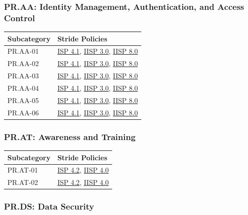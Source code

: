 \documentclass[11pt,landscape]{article}
\begin{document}
\subsubsection{PR.AA: Identity Management, Authentication, and Access Control}

\begin{tabularx}{\textwidth}{|p{3.5cm}|X|}
\hline
\rowcolor{headgray} \textbf{Subcategory} & \textbf{Stride Policies} \\
\hline
PR.AA-01 & \hyperref[pol:ISP41]{ISP 4.1}, \hyperref[pol:IISP30]{IISP 3.0}, \hyperref[pol:IISP80]{IISP 8.0} \\
\hline
PR.AA-02 & \hyperref[pol:ISP41]{ISP 4.1}, \hyperref[pol:IISP30]{IISP 3.0}, \hyperref[pol:IISP80]{IISP 8.0} \\
\hline
PR.AA-03 & \hyperref[pol:ISP41]{ISP 4.1}, \hyperref[pol:IISP30]{IISP 3.0}, \hyperref[pol:IISP80]{IISP 8.0} \\
\hline
PR.AA-04 & \hyperref[pol:ISP41]{ISP 4.1}, \hyperref[pol:IISP30]{IISP 3.0}, \hyperref[pol:IISP80]{IISP 8.0} \\
\hline
PR.AA-05 & \hyperref[pol:ISP41]{ISP 4.1}, \hyperref[pol:IISP30]{IISP 3.0}, \hyperref[pol:IISP80]{IISP 8.0} \\
\hline
PR.AA-06 & \hyperref[pol:ISP41]{ISP 4.1}, \hyperref[pol:IISP30]{IISP 3.0}, \hyperref[pol:IISP80]{IISP 8.0} \\
\hline
\end{tabularx}

\subsubsection{PR.AT: Awareness and Training}

\begin{tabularx}{\textwidth}{|p{3.5cm}|X|}
\hline
\rowcolor{headgray} \textbf{Subcategory} & \textbf{Stride Policies} \\
\hline
PR.AT-01 & \hyperref[pol:ISP42]{ISP 4.2}, \hyperref[pol:IISP40]{IISP 4.0} \\
\hline
PR.AT-02 & \hyperref[pol:ISP42]{ISP 4.2}, \hyperref[pol:IISP40]{IISP 4.0} \\
\hline
\end{tabularx}

\subsubsection{PR.DS: Data Security}
\end{document}
